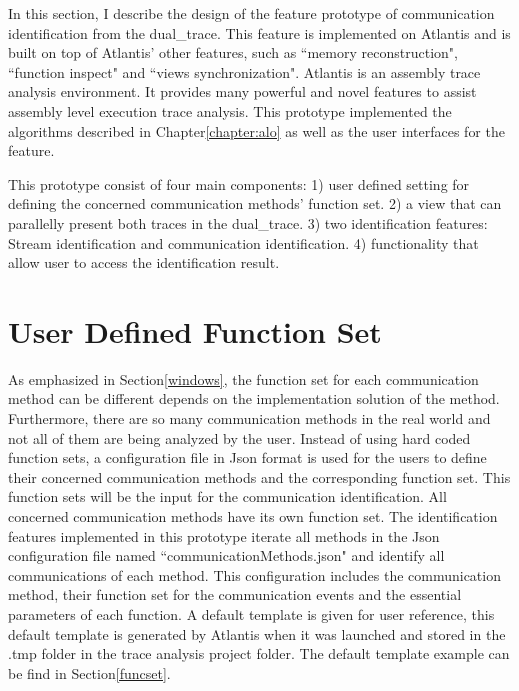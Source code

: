 

\label{chapter:newsol}
In this section, I describe the design of the feature prototype of communication identification from the dual\_trace. This feature is implemented on Atlantis and is built on top of Atlantis' other features, such as ``memory reconstruction", ``function inspect" and ``views synchronization". Atlantis is an assembly trace analysis environment. It provides many powerful and novel features to assist assembly level execution trace analysis.\cite{huang2017atlantis} This prototype implemented the algorithms described in Chapter\ref{chapter:alo} as well as the user interfaces for the feature.

This prototype consist of four main components: 1) user defined setting for defining the concerned communication methods' function set. 2) a view that can parallelly present both traces in the dual\_trace. 3) two identification features: Stream identification and communication identification. 4) functionality that allow user to access the identification result.


\section{User Defined Function Set}\label{functionset}
As emphasized in Section\ref{windows}, the function set for each communication method can be different depends on the implementation solution of the method. Furthermore, there are so many communication methods in the real world and not all of them are being analyzed by the user. Instead of using hard coded function sets, a configuration file in Json format is used for the users to define their concerned communication methods and the corresponding function set. This function sets will be the input for the communication identification. All concerned communication methods have its own function set. The identification features implemented in this prototype iterate all methods in the Json configuration file named ``communicationMethods.json" and identify all communications of each method. This configuration includes the communication method, their function set for the communication events and the essential parameters of each function. A default template is given for user reference, this default template is generated by Atlantis when it was launched and stored in the .tmp folder in the trace analysis project folder. The default template example can be find in Section\ref{funcset}.

